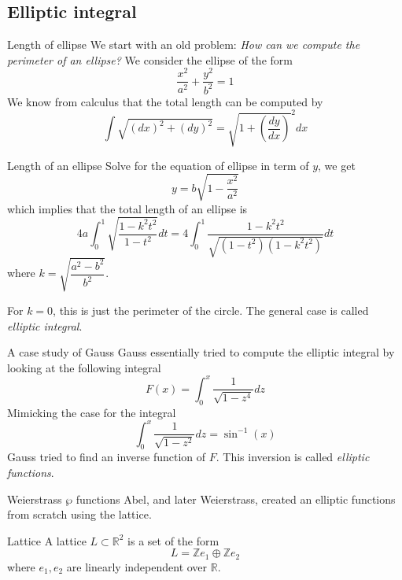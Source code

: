 \documentclass[pdf]{beamer}
\begin{document}
\subsection{Elliptic integral}
\begin{frame}{Length of ellipse}
    We start with an old problem: \textit{How can we compute the perimeter of an ellipse?}
    \pause
    We consider the ellipse of the form
    \[\dfrac{x^2}{a^2}+\dfrac{y^2}{b^2}=1\]
    We know from calculus that the total length can be computed by
    \[\int\sqrt{(dx)^2+(dy)^2}= \sqrt{1+\left(\dfrac{dy}{dx}\right)}^2dx \]
\end{frame}
\begin{frame}{Length of an ellipse}
    Solve for the equation of ellipse in term of $y$, we get
    \[y = b\sqrt{1-\frac{x^2}{a^2}}\]
    which implies that
    the total length of an ellipse is
    \[4a \int_0^1 \sqrt{\dfrac{1-k^2t^2}{1-t^2}}dt = 4\int_0^1 \dfrac{1-k^2t^2}{\sqrt{(1-t^2)(1-k^2t^2)}}dt \] \pause%
    where $k = \sqrt{\dfrac{a^2-b^2}{b^2}}$.

    For $k =0$, this is just the perimeter of the circle.  The general case is called \textit{elliptic integral}.

\end{frame}
\begin{frame}{A case study of Gauss}
    Gauss essentially tried to compute the elliptic integral by looking at the
    following integral
    \[F(x) = \displaystyle\int_0^x\dfrac{1}{\sqrt{1-z^4}}dz\]
    Mimicking the case for the integral
    \[ \int_0^x\dfrac{1}{\sqrt{1-z^2}}dz = \sin^{-1}(x)\]
    Gauss tried to find an inverse function of $F$. This inversion is called \textit{elliptic functions}.
\end{frame}
\begin{frame}{Weierstrass $\wp$ functions}
    Abel, and later Weierstrass, created an elliptic functions from scratch using the lattice.
    \begin{block}{Lattice}
        A lattice $L \subset \mathbb{R}^2$ is a set of the form
        \[L = \mathbb{Z}e_1\oplus\mathbb{Z}e_2\]
        where $e_1,e_2$ are linearly independent over $\mathbb{R}$.
    \end{block}
\end{frame}
\end{document}
